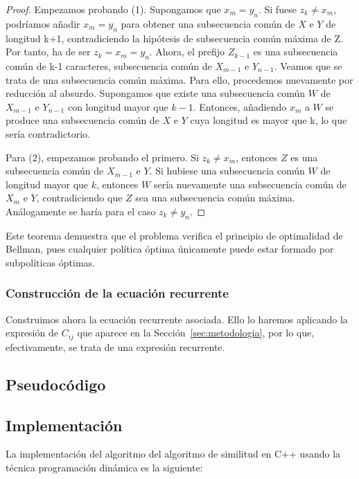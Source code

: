 \begin{proof}
  Empezamos probando (1). Supongamos que $x_m = y_n$. Si fuese $z_k \neq x_m$,
  podríamos añadir $x_m = y_n$ para obtener una subsecuencia común de $X$ e $Y$ 
  de longitud k+1, contradiciendo la hipótesis de subsecuencia común máxima de Z. 
  Por tanto, ha de ser $z_k = x_m = y_n$. Ahora, el prefijo $Z_{k-1}$ es una
  subsecuencia común de k-1 caracteres, subsecuencia común de $X_{m-1}$ e $Y_{n-1}$.
  Veamos que se trata de una subsecuencia común máxima. Para ello, procedemos
  nuevamente por reducción al absurdo. Supongamos que existe una subsecuencia común $W$ de
  $X_{m-1}$ e $Y_{n-1}$ con longitud mayor que $k-1$. Entonces, añadiendo $x_m$ a $W$
  se produce una subsecuencia común de $X$ e $Y$ cuya longitud es mayor que k, lo
  que sería contradictorio.

  Para (2), empezamos probando el primero. Si $z_k \neq x_m$, entonces $Z$ es una
  subsecuencia común de $X_{m-1}$ e $Y$. Si hubiese una subsecuencia común $W$
  de longitud mayor que $k$, entonces $W$ sería nuevamente una subsecuencia común 
  de $X_m$ e $Y$, contradiciendo que $Z$ sea una subsecuencia común máxima.
  Análogamente se haría para el caso $z_k \neq y_n$. 
\end{proof}

Este teorema demuestra que el problema verifica el principio de optimalidad de
Bellman, pues cualquier política óptima únicamente puede estar formado por
subpolíticas óptimas. 

\subsubsection{Construcción de la ecuación recurrente}

Construimos ahora la ecuación recurrente asociada. Ello lo haremos aplicando
la expresión de $C_{ij}$ que aparece en la Sección~\ref{sec:metodologia}, por lo
que, efectivamente, se trata de una expresión recurrente. 

\subsection{Pseudocódigo}

\subsection{Implementación}

La implementación del algoritmo del algoritmo de similitud en C++ usando la técnica programación dinámica es la siguiente:


